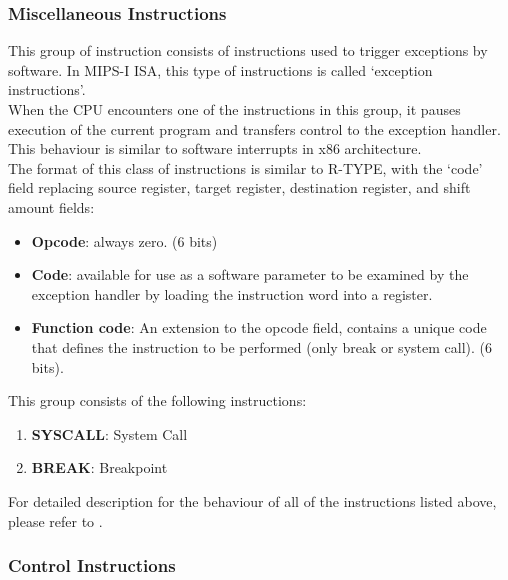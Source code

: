 \documentclass[oneside]{book}
\begin{document}
\subsubsection{Miscellaneous Instructions}

This group of instruction consists of instructions used to trigger
exceptions by software. In MIPS-I ISA, this type of instructions is
called `exception instructions'.\\

When the CPU encounters one of the instructions in this group,
it pauses execution of the current program and transfers control
to the exception handler. This behaviour is similar to
software interrupts in x86 architecture.\\

The format of this class of instructions is similar to R-TYPE,
with the `code' field replacing source register,
target register, destination register, and shift amount fields:

\begin{itemize}

\item \textbf{Opcode}: always zero. (6 bits)

\item \textbf{Code}: available for use as a software parameter to be
                     examined by the exception handler by loading
                     the instruction word into a register.

\item \textbf{Function code}: An extension to the opcode field, contains
                              a unique code that defines the instruction
                              to be performed (only break or system call).
                              (6 bits).

\end{itemize}

This group consists of the following instructions:

\begin{enumerate}

\item \textbf{SYSCALL}: System Call
\item \textbf{BREAK}:   Breakpoint

\end{enumerate}

For detailed description for the behaviour of all of the instructions listed
above, please refer to \cite{mips_isa}.

\subsubsection{Control Instructions}
\end{document}
